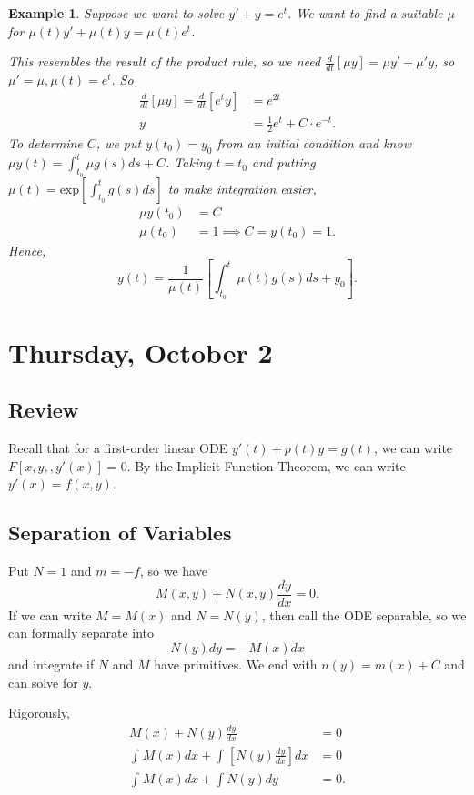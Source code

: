\documentclass{tufte-handout}
\newtheorem{ex}[thm]{Example}
\theoremstyle{definition}
\begin{document}
\begin{ex}
	Suppose we want to solve $y' + y = e^{t}$. We want to find a suitable $\mu$ for $\mu(t)y' + \mu(t) y = \mu(t) e^t$.

	This resembles the result of the product rule, so we need $\frac{d}{dt} \left[ \mu y \right] = \mu y' + \mu' y$, so $\mu' = \mu, \mu(t) = e^t.$ So 
	\begin{align*}
		\frac{d}{dt}\left[ \mu y \right] = \frac{d}{dt}\left[ e^{t}y \right]  &= e^{2t} \\
		y &= \frac{1}{2} e^t + C \cdot e^{-t}
	.\end{align*} 
	To determine $C$, we put $y(t_0) = y_0$ from an initial condition and know $\mu y(t) = \int_{t_0}^{t} \mu g(s)ds + C$. Taking $t=t_0$ and putting $\mu(t) = \text{exp}\left[ \int_{t_0}^{t} g(s)ds  \right] $ to make integration easier, 
	\begin{align*}
		\mu y(t_0) &= C \\
		\mu(t_0) &= 1 \implies C = y(t_0) = 1
	.\end{align*}
	Hence, \[
		y(t) = \frac{1}{\mu(t)} \left[ \int_{t_0}^{t} \mu(t) g(s)ds + y_0  \right] 
	.\] 
\end{ex}

\section{Thursday, October 2}

\subsection{Review}
Recall that for a first-order linear ODE $y'(t) + p(t)y = g(t)$, we can write $F\left[ x,y,,y'(x)  \right] = 0$. By the Implicit Function Theorem, we can write $y'(x) = f(x,y).$

\subsection{Separation of Variables}
Put $N=1$ and $m=-f$, so we have
\[
	M(x,y) + N(x,y) \frac{dy}{dx} = 0.
\]
If we can write $M = M(x)$ and $N = N(y)$, then call the ODE separable, so we can formally separate into \[
	N(y)dy = -M(x)dx
\] and integrate if $N$ and $M$ have primitives. We end with $n(y) = m(x) + C$ and can solve for $y$.

Rigorously,
\begin{align*}
	M(x) + N(y) \frac{dy}{dx} &= 0 \\
	\int_{}^{}  M(x)dx + \int_{}^{}[ N(y) \frac{dy}{dx}] dx &=  0 \\
	\int_{}^{} M(x)dx + \int N(y) dy &= 0  
.\end{align*}
\end{document}
